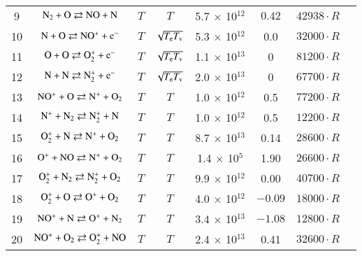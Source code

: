 \documentclass{warpdoc}
\begin{document}
\begin{table}[t]
\begin{center}
\begin{threeparttable}
\begin{tabular}{cccccccc}
9 & $\rm N_2 + O \rightleftarrows NO + N $ & $T$ & $T$ & 5.7 $\times$ 10$^{12}$  & $0.42$ & $42938 \cdot R$ & \cite{jcp:1996:bose}\\


10 & $\rm N + O \rightleftarrows NO^+ + e^- $ & $T$ & $\sqrt{T_{\rm e} T_{\rm v}}$ & 5.3 $\times$ 10$^{12}$  & 0.0 & $32000 \cdot R$ & \cite{pf:2007:boyd}\\

11 & $\rm O + O \rightleftarrows O_2^+ + e^- $ & $T$ & $\sqrt{T_{\rm e} T_{\rm v}}$  & 1.1 $\times$ 10$^{13}$  & 0 & $81200 \cdot R$ & \cite{pf:2007:boyd}\\

12 & $\rm N + N \rightleftarrows N_2^+ + e^- $ & $T$ & $\sqrt{T_{\rm e} T_{\rm v}}$ & 2.0 $\times$ 10$^{13}$  & 0 & $67700 \cdot R$ & \cite{pf:2007:boyd}\\

13 & $\rm NO^+ + O \rightleftarrows N^+ + O_2 $ & $T$ & $T$  & 1.0 $\times$ 10$^{12}$  & 0.5 & $77200 \cdot R$ & \cite{book:1990:park}\\

14 & $\rm N^+ + N_2 \rightleftarrows N_2^+ + N $ & $T$ & $T$  & 1.0 $\times$ 10$^{12}$  & 0.5 & $12200 \cdot R$ & \cite{book:1990:park}\\

15 & $\rm O_2^+ + N \rightleftarrows N^+ + O_2 $ & $T$ & $T$  & 8.7 $\times$ 10$^{13}$  & 0.14 & $28600 \cdot R$ & \cite{book:1990:park}\\

16 & $\rm O^+ + NO \rightleftarrows N^+ + O_2 $ & $T$ & $T$  & 1.4 $\times$ 10$^{5}$  & 1.90 & $26600 \cdot R$ & \cite{book:1990:park}\\

17 & $\rm O_2^+ + N_2 \rightleftarrows N_2^+ + O_2 $ & $T$  & $T$ & 9.9 $\times$ 10$^{12}$  & 0.00 & $40700 \cdot R$ & \cite{book:1990:park}\\

18 & $\rm O_2^+ + O \rightleftarrows O^+ + O_2 $ & $T$ & $T$  & 4.0 $\times$ 10$^{12}$  & $-0.09$ & $18000 \cdot R$ & \cite{book:1990:park}\\

19 & $\rm NO^+ + N \rightleftarrows O^+ + N_2 $ & $T$ & $T$  & 3.4 $\times$ 10$^{13}$  & $-1.08$ & $12800 \cdot R$ & \cite{book:1990:park}\\

20 & $\rm NO^+ + O_2 \rightleftarrows O_2^+ + NO $ & $T$ & $T$  & 2.4 $\times$ 10$^{13}$  & 0.41 & $32600 \cdot R$ & \cite{book:1990:park}\\


\end{tabular}
\end{threeparttable}
\end{center}
\end{table}
\end{document}
